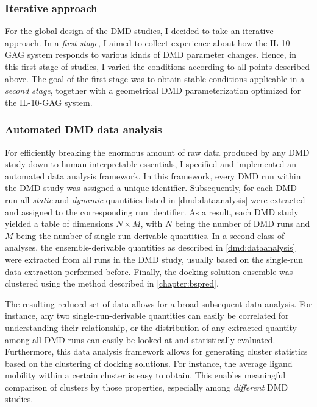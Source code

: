 \subsubsection{Iterative approach}

For the global design of the DMD studies, I decided to take an iterative
approach. In a \textit{first stage}, I aimed to collect experience about how the
IL-10-GAG system responds to various kinds of DMD parameter changes. Hence, in
this first stage of studies, I varied the conditions according to all points
described above. The goal of the first stage was to obtain stable conditions
applicable in a \textit{second stage}, together with a geometrical DMD
parameterization optimized for the IL-10-GAG system.


\subsubsection{Automated DMD data analysis}

For efficiently breaking the enormous amount of raw data produced by any DMD
study down to human-interpretable essentials, I specified and implemented an
automated data analysis framework. In this framework, every DMD run within the
DMD study was assigned a unique identifier. Subsequently, for each DMD run all
\textit{static} and \textit{dynamic} quantities listed in
\cref{dmd:dataanalysis} were extracted and assigned to the corresponding run
identifier. As a result, each DMD study yielded a table of dimensions $N \times
M$, with $N$ being the number of DMD runs and $M$ being the number of
single-run-derivable quantities. In a second class of analyses, the
ensemble-derivable quantities as described in \cref{dmd:dataanalysis} were
extracted from all runs in the DMD study, usually based on the single-run data
extraction performed before. Finally, the docking solution ensemble was
clustered using the method described in \cref{chapter:bspred}.

The resulting reduced set of data allows for a broad subsequent data analysis.
For instance, any two single-run-derivable quantities can easily be correlated
for understanding their relationship, or the distribution of any extracted
quantity among all DMD runs can easily be looked at and statistically evaluated.
Furthermore, this data analysis framework allows for generating cluster
statistics based on the clustering of docking solutions. For instance, the
average ligand mobility within a certain cluster is easy to obtain. This enables
meaningful comparison of clusters by those properties, especially among
\textit{different} DMD studies.



